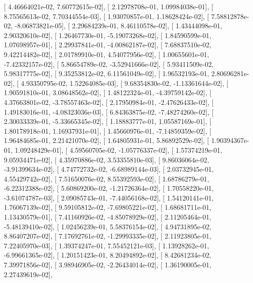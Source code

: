 \documentclass{article}
\begin{document}
       [  4.46664021e-02,   7.60772615e-02],
       [  2.12978708e-01,   1.09984038e-01],
       [  8.75565613e-02,   7.70344554e-03],
       [  1.93070857e-01,   1.18628424e-02],
       [  7.58812878e-02,  -8.06873821e-05],
       [  2.29684239e-01,   8.46110578e-02],
       [  1.43444098e-01,   2.90320610e-02],
       [  1.26467730e-01,  -5.19073268e-02],
       [  1.84590599e-01,   1.07698957e-01],
       [  2.29937841e-01,  -4.00862187e-02],
       [  7.68837510e-02,   9.42214482e-02],
       [  2.01789910e-01,   4.54077956e-02],
       [  1.00655601e-01,  -7.42332157e-02],
       [  5.86654789e-02,  -3.52941666e-02],
       [  5.93411509e-02,   5.98317775e-02],
       [  9.35253812e-02,   6.11561049e-02],
       [  1.96532193e-01,   2.80696281e-02],
       [  4.93350795e-02,   1.52264085e-03],
       [  9.68354830e-02,  -1.13361644e-02],
       [  1.90591810e-01,   3.08648562e-02],
       [  1.48122324e-01,  -4.39759142e-02],
       [  4.37663801e-02,  -3.78557463e-02],
       [  2.17950984e-01,  -2.47626433e-02],
       [  1.49183016e-01,  -4.08323036e-03],
       [  6.84363875e-02,  -7.48274260e-02],
       [  2.30033339e-01,  -5.33665345e-02],
       [  1.18883777e-01,   1.05587169e-01],
       [  1.80178918e-01,   1.16937931e-01],
       [  1.45660976e-01,  -7.14859359e-02],
       [  1.96484685e-01,   2.21421070e-02],
       [  1.64805931e-01,   5.86892529e-02],
       [  1.90394367e-01,   1.09248429e-01],
       [  4.59560705e-02,  -1.05776337e-02],
       [  1.57374219e-01,   9.05934471e-02],
       [  4.35970886e-02,   3.53355810e-03],
       [  9.86036064e-02,  -3.91399634e-02],
       [  4.74772732e-02,  -6.68989144e-03],
       [  2.03732945e-01,   4.55429742e-02],
       [  7.51650076e-02,   8.55392593e-02],
       [  1.68786279e-01,  -6.22312388e-02],
       [  5.60869200e-02,  -1.21726364e-02],
       [  1.70558220e-01,  -3.61074787e-03],
       [  2.09085743e-01,  -7.44056168e-02],
       [  1.54120141e-01,   1.76067139e-02],
       [  9.59105812e-02,  -7.69805221e-02],
       [  1.68681711e-01,   1.13430579e-01],
       [  7.41160926e-02,  -4.85078929e-02],
       [  2.11205464e-01,  -5.48139410e-02],
       [  1.02456239e-01,   5.58376154e-02],
       [  4.94731895e-02,   8.86407207e-02],
       [  7.17692761e-02,  -1.29993335e-02],
       [  2.11923805e-01,   7.22405970e-03],
       [  1.39374247e-01,   7.55452121e-03],
       [  1.13928262e-01,  -6.99661365e-02],
       [  1.20151423e-01,   8.20494892e-02],
       [  8.42681234e-02,   7.39971856e-02],
       [  3.98946905e-02,  -2.26434014e-02],
       [  1.36190005e-01,   2.27439619e-02],
\end{document}
